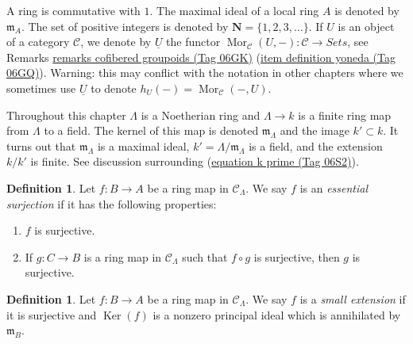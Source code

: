 \documentclass{amsart}
\theoremstyle{plain}
\theoremstyle{definition}
\newtheorem{definition}[subsection]{Definition}
\theoremstyle{remark}
\numberwithin{equation}{subsection}
\def\Mor{\mathop{\mathrm{Mor}}\nolimits}
\def\Ker{\mathop{\mathrm{Ker}}}
\begin{document}
\noindent
A ring is commutative with $1$. The  maximal ideal of a local ring $A$
is denoted by $\mathfrak{m}_A$. The set of positive integers is denoted
by $\mathbf{N} = \{1, 2, 3, \ldots\}$. If $U$ is an object of a
category $\mathcal{C}$, we denote by $\underline{U}$
the functor
$\Mor_\mathcal{C}(U, -): \mathcal{C} \to \textit{Sets}$, see
Remarks \href{https://stacks.math.columbia.edu/tag/06GK}{remarks cofibered groupoids (Tag 06GK)} (\href{https://stacks.math.columbia.edu/tag/06GQ}{item definition yoneda (Tag 06GQ)}).
Warning: this may conflict with the notation in other chapters where we
sometimes use $\underline{U}$ to denote $h_U(-) = \Mor_\mathcal{C}(-, U)$.

\medskip\noindent
Throughout this chapter $\Lambda$ is a Noetherian ring and
$\Lambda \to k$ is a finite ring map from $\Lambda$ to a field.
The kernel of this map is denoted $\mathfrak m_\Lambda$ and the
image $k' \subset k$. It turns out that $\mathfrak m_\Lambda$ is
a maximal ideal, $k' = \Lambda/\mathfrak m_\Lambda$ is a field, and
the extension $k/k'$ is finite. See discussion surrounding
(\href{https://stacks.math.columbia.edu/tag/06S2}{equation k prime (Tag 06S2)}).




\begin{definition}
\label{definition-essential-surjection}
Let $f: B \to A$ be a ring map in $\mathcal{C}_\Lambda$.  We say $f$
is an {\it essential surjection} if it has the following properties:
\begin{enumerate}
\item $f$ is surjective.
\item If $g: C \to B$ is a ring map in $\mathcal{C}_\Lambda$ such that
$f \circ g$ is surjective, then $g$ is surjective.
\end{enumerate}
\end{definition}

\begin{definition}
\label{definition-small-extension}
Let $f: B \to A$ be a ring map in $\mathcal{C}_\Lambda$.  We say $f$
is a {\it small extension} if it is surjective and $\Ker(f)$ is a nonzero
principal ideal which is annihilated by $\mathfrak{m}_B$.
\end{definition}
\end{document}
